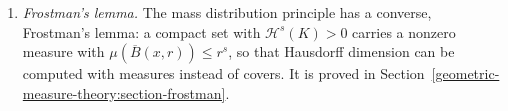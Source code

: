 \begin{remark}
\begin{enumerate}
$x$ \cite{preiss-1987}, and \emph{Marstrand's theorem} says that if $0 < \Theta^s(\mu, x) < \infty$ on a set of positive $\mu$-measure, then $s$ is an integer \cite{mattila-1995}. Preiss's proof
studies the \emph{tangent measures} of $\mu$ at $x$, the weak limits (Section~\ref{radon-measures:section-weak-convergence}) of the rescaled measures $A \mapsto \mu(x + rA)/r^k$ as $r \to 0$; existence
of the density forces them to be flat.
\item \emph{Frostman's lemma.} The mass distribution principle has a converse, Frostman's lemma: a compact set with $\mathcal{H}^s(K) > 0$ carries a nonzero measure with
$\mu(\overline{B}(x, r)) \leq r^s$, so that Hausdorff dimension can be computed with measures instead of covers. It is proved in Section~\ref{geometric-measure-theory:section-frostman}.
\end{enumerate}
\end{remark}

